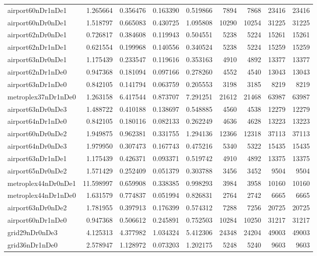 \begin{longtable}{|l|r|r|r|r|r|r|r|r|}
airport60nDr1nDe1 & 1.265664 & 0.356476 & 0.163390 & 0.519866 & 7894 & 7868 & 23416 & 23416 \\
airport60nDr0nDe1 & 1.518797 & 0.665083 & 0.430725 & 1.095808 & 10290 & 10254 & 31225 & 31225 \\
airport62nDr0nDe1 & 0.726817 & 0.384608 & 0.119943 & 0.504551 & 5238 & 5224 & 15261 & 15261 \\
airport62nDr1nDe1 & 0.621554 & 0.199968 & 0.140556 & 0.340524 & 5238 & 5224 & 15259 & 15259 \\
airport63nDr0nDe1 & 1.175439 & 0.233547 & 0.119616 & 0.353163 & 4910 & 4892 & 13377 & 13377 \\
airport62nDr1nDe0 & 0.947368 & 0.181094 & 0.097166 & 0.278260 & 4552 & 4540 & 13043 & 13043 \\
airport63nDr1nDe0 & 0.842105 & 0.141794 & 0.063759 & 0.205553 & 3198 & 3185 & 8219 & 8219 \\
metroplex37nDr1nDe0 & 1.263158 & 6.417544 & 0.873707 & 7.291251 & 21612 & 21468 & 63987 & 63987 \\
airport63nDr0nDe3 & 1.488722 & 0.410188 & 0.138697 & 0.548885 & 4560 & 4538 & 12279 & 12279 \\
airport64nDr1nDe0 & 0.842105 & 0.180116 & 0.082133 & 0.262249 & 4636 & 4628 & 13223 & 13223 \\
airport60nDr0nDe2 & 1.949875 & 0.962381 & 0.331755 & 1.294136 & 12366 & 12318 & 37113 & 37113 \\
airport64nDr0nDe3 & 1.979950 & 0.307473 & 0.167743 & 0.475216 & 5340 & 5322 & 15435 & 15435 \\
airport63nDr1nDe1 & 1.175439 & 0.426371 & 0.093371 & 0.519742 & 4910 & 4892 & 13375 & 13375 \\
airport65nDr0nDe2 & 1.571429 & 0.252409 & 0.051379 & 0.303788 & 3456 & 3452 & 9504 & 9504 \\
metroplex44nDr0nDe1 & 11.598997 & 0.659908 & 0.338385 & 0.998293 & 3984 & 3958 & 10160 & 10160 \\
metroplex44nDr1nDe0 & 1.631579 & 0.774837 & 0.051994 & 0.826831 & 2764 & 2742 & 6665 & 6665 \\
airport63nDr0nDe2 & 1.781955 & 0.397913 & 0.176399 & 0.574312 & 7288 & 7256 & 20725 & 20725 \\
airport60nDr1nDe0 & 0.947368 & 0.506612 & 0.245891 & 0.752503 & 10284 & 10250 & 31217 & 31217 \\
grid29nDr0nDe3 & 4.125313 & 4.377982 & 1.034324 & 5.412306 & 24348 & 24204 & 49003 & 49003 \\
grid36nDr1nDe0 & 2.578947 & 1.128972 & 0.073203 & 1.202175 & 5248 & 5240 & 9603 & 9603 \\

\end{longtable}
